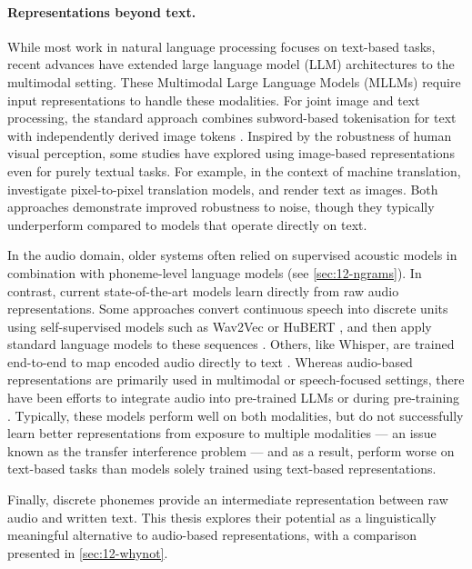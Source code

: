 \paragraph{Representations beyond text.}

While most work in natural language processing focuses on text-based tasks, recent advances have extended large language model (LLM) architectures to the multimodal setting. These Multimodal Large Language Models (MLLMs) require input representations to handle these modalities. For joint image and text processing, the standard approach combines subword-based tokenisation for text with independently derived image tokens \citep{cui2024survey, team2024chameleon, liu2023visual}. Inspired by the robustness of human visual perception, some studies have explored using image-based representations even for purely textual tasks. For example, in the context of machine translation, \citet{mansimov-etal-2020-towards} investigate pixel-to-pixel translation models, and \citet{salesky-etal-2021-robust} render text as images. Both approaches demonstrate improved robustness to noise, though they typically underperform compared to models that operate directly on text.

In the audio domain, older systems often relied on supervised acoustic models in combination with phoneme-level language models (see \cref{sec:12-ngrams}). In contrast, current state-of-the-art models learn directly from raw audio representations. Some approaches convert continuous speech into discrete units using self-supervised models such as Wav2Vec \citep{baevski2020wav2vec} or HuBERT \citep{hsu-2021-hubert}, and then apply standard language models to these sequences \citep{lakhotia2021generative}. Others, like Whisper, are trained end-to-end to map encoded audio directly to text \citep{radford2023robust}. Whereas audio-based representations are primarily used in multimodal or speech-focused settings, there have been efforts to integrate audio into pre-trained LLMs \citep{nguyen-etal-2025-spirit} or during pre-training \citep{bapna2021slam}. Typically, these models perform well on both modalities, but do not successfully learn better representations from exposure to multiple modalities --- an issue known as the transfer interference problem \citep{arivazhagan2019massively} --- and as a result, perform worse on text-based tasks than models solely trained using text-based representations. 

Finally, discrete phonemes provide an intermediate representation between raw audio and written text. This thesis explores their potential as a linguistically meaningful alternative to audio-based representations, with a comparison presented in \cref{sec:12-whynot}.

